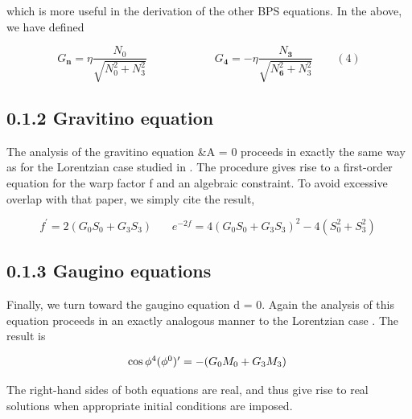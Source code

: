 \documentclass{article}
\begin{document}
which is more useful in the derivation of the other BPS equations. In the above, we have
defined


\begin{equation}
G _ { \mathbf { n } } = \eta \frac { N _ { 0 } } { \sqrt { N _ { 0 } ^ { 2 } + N _ { 3 } ^ { 2 } } } \qquad \qquad \qquad G _ { \mathbf { 4 } } = - \eta \frac { N _ { \mathbf { 3 } } } { \sqrt { N _ { \mathbf { 6 } } ^ { 2 } + N _ { 3 } ^ { 2 } } } \qquad ( 4 )
\end{equation}


\subsection*{0.1.2 Gravitino equation}


The analysis of the gravitino equation \&A = 0 proceeds in exactly the same way as for the
Lorentzian case studied in . The procedure gives rise to a first-order equation for the warp
factor f and an algebraic constraint. To avoid excessive overlap with that paper, we simply
cite the result,


\begin{equation}
f ^ { \prime } = 2 ( G _ { 0 } S _ { 0 } + G _ { 3 } S _ { 3 } ) ~ ~ ~ ~ ~ ~ ~ ~ e ^ { - 2 f } = 4 ( G _ { 0 } S _ { 0 } + G _ { 3 } S _ { 3 } ) ^ { 2 } - 4 ( S _ { 0 } ^ { 2 } + S _ { 3 } ^ { 2 } ) ~
\end{equation}


\subsection*{0.1.3 Gaugino equations}


Finally, we turn toward the gaugino equation d = 0. Again the analysis of this equation
proceeds in an exactly analogous manner to the Lorentzian case . The result is


\begin{equation}
\begin{array} { c c } { \cos \phi ^ { 4 } ( \phi ^ { 0 } ) ^ { \prime } = - ( G _ { 0 } M _ { 0 } + G _ { 3 } M _ { 3 } ) ~ }\end{array}
\end{equation}


The right-hand sides of both equations are real, and thus give rise to real solutions when
appropriate initial conditions are imposed.
\end{document}
